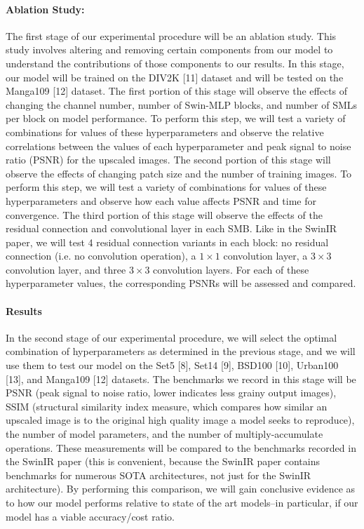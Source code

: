 \documentclass{article}
\begin{document}
\paragraph{Ablation Study:} The first stage of our experimental procedure will be an ablation study. This study involves altering and removing certain components from our model to understand the contributions of those components to our results. In this stage, our model will be trained on the DIV2K [11] dataset and will be tested on the Manga109 [12] dataset. The first portion of this stage will observe the effects of changing the channel number, number of Swin-MLP blocks, and number of SMLs per block on model performance. To perform this step, we will test a variety of combinations for values of these hyperparameters and observe the relative correlations between the values of each hyperparameter and peak signal to noise ratio (PSNR) for the upscaled images. The second portion of this stage will observe the effects of changing patch size and the number of training images. To perform this step, we will test a variety of combinations for values of these hyperparameters and observe how each value affects PSNR and time for convergence. The third portion of this stage will observe the effects of the residual connection and convolutional layer in each SMB. Like in the SwinIR paper, we will test 4 residual connection variants in each block: no residual connection (i.e. no convolution operation), a $1 \times 1$ convolution layer, a $3 \times 3$ convolution layer, and three $3 \times 3$ convolution layers. For each of these hyperparameter values, the corresponding PSNRs will be assessed and compared.

\paragraph{Results} In the second stage of our experimental procedure, we will select the optimal combination of hyperparameters as determined in the previous stage, and we will use them to test our model on the Set5 [8], Set14 [9], BSD100 [10], Urban100 [13], and Manga109 [12] datasets. The benchmarks we record in this stage will be PSNR (peak signal to noise ratio, lower indicates less grainy output images), SSIM (structural similarity index measure, which compares how similar an upscaled image is to the original high quality image a model seeks to reproduce), the number of model parameters, and the number of multiply-accumulate operations. These measurements will be compared to the benchmarks recorded in the SwinIR paper (this is convenient, because the SwinIR paper contains benchmarks for numerous SOTA architectures, not just for the SwinIR architecture). By performing this comparison, we will gain conclusive evidence as to how our model performs relative to state of the art models–in particular, if our model has a viable accuracy/cost ratio.
\end{document}
